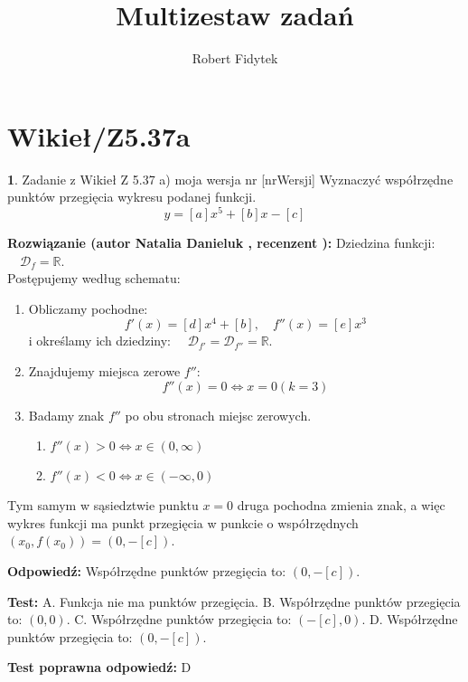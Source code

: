 \documentclass[12pt, a4paper]{article}
\title{Multizestaw zadań}
\author{Robert Fidytek}
\date{}
\theoremstyle{definition} %
\newtheorem{zad}{}
\newcommand{\kategoria}[1]{\section{#1}} %
\newcommand{\zadStart}[1]{\begin{zad}#1\newline} %
\newcommand{\zadStop}{\end{zad}}   %
\newcommand{\rozwStart}[2]{\noindent \textbf{Rozwiązanie (autor #1 , recenzent #2): }\newline} %
\newcommand{\rozwStop}{\newline}                                            %
\newcommand{\odpStart}{\noindent \textbf{Odpowiedź:}\newline}    %
\newcommand{\odpStop}{\newline}                                             %
\newcommand{\testStart}{\noindent \textbf{Test:}\newline} %
\newcommand{\testStop}{\newline} %
\newcommand{\kluczStart}{\noindent \textbf{Test poprawna odpowiedź:}\newline} %
\newcommand{\kluczStop}{\newline} %
\begin{document}
\maketitle

\kategoria{Wikieł/Z5.37a}

\zadStart{Zadanie z Wikieł Z 5.37 a) moja wersja nr [nrWersji]}
Wyznaczyć współrzędne punktów przegięcia wykresu podanej funkcji.
$$y = [a]x^5 + [b]x - [c]$$
\zadStop

\rozwStart{Natalia Danieluk}{}
Dziedzina funkcji: $\quad \mathcal{D}_f=\mathbb{R}$. \\
Postępujemy według schematu:
\begin{enumerate}
\item Obliczamy pochodne: 
$$f'(x) = [d]x^4 + [b],\quad f''(x) = [e]x^3$$
i określamy ich dziedziny: $\quad \mathcal{D}_{f'}=\mathcal{D}_{f''}=\mathbb{R}$. \\
\item Znajdujemy miejsca zerowe $f''$: \\
$$f''(x)=0 \Leftrightarrow x=0 (k=3)$$
\item Badamy znak $f''$ po obu stronach miejsc zerowych. \\
	\begin{enumerate}
	\item $f''(x) > 0 \Leftrightarrow x \in (0,\infty)$\\
	\item $f''(x) < 0 \Leftrightarrow x \in (-\infty,0)$
	\end{enumerate}
\end{enumerate}
Tym samym w sąsiedztwie punktu $x=0$ druga pochodna zmienia znak, a więc wykres funkcji ma punkt przegięcia w punkcie o współrzędnych $(x_0,f(x_0)) = (0,-[c])$.
\rozwStop

\odpStart
Współrzędne punktów przegięcia to: $(0,-[c])$.
\odpStop

\testStart
A. Funkcja nie ma punktów przegięcia.
B. Współrzędne punktów przegięcia to: $(0,0)$.
C. Współrzędne punktów przegięcia to: $(-[c],0)$.
D. Współrzędne punktów przegięcia to: $(0,-[c])$.
\testStop

\kluczStart
D
\kluczStop
\end{document}
